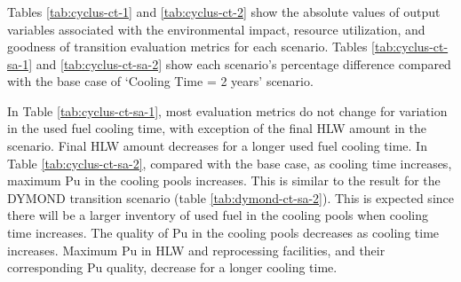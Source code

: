 \begin{table}[H]
        \end{table}

    
\subsubsection{\textbf{\Cyclus}}

Tables \ref{tab:cyclus-ct-1} and \ref{tab:cyclus-ct-2} show 
the absolute values of 
output variables associated with the environmental impact, 
resource utilization, and goodness of transition evaluation 
metrics for each scenario. 
Tables \ref{tab:cyclus-ct-sa-1} and \ref{tab:cyclus-ct-sa-2} 
show each scenario's percentage 
difference compared with the base case of `Cooling Time = 2 years'
scenario.

In Table \ref{tab:cyclus-ct-sa-1}, most evaluation metrics do not change 
for variation in the used fuel cooling time, with exception of the final 
HLW amount in the scenario. 
Final HLW amount decreases for a longer used fuel cooling time.
In Table \ref{tab:cyclus-ct-sa-2}, compared with the base case, 
as cooling time increases, maximum Pu in the cooling pools increases.
This is similar to the result for the DYMOND transition scenario (table 
\ref{tab:dymond-ct-sa-2}). 
This is expected since there will be a larger inventory of used fuel 
in the cooling pools when cooling time increases. 
The quality of Pu in the cooling pools decreases as cooling time 
increases. 
Maximum Pu in HLW and reprocessing facilities, and their corresponding 
Pu quality, decrease for a longer cooling time. 

